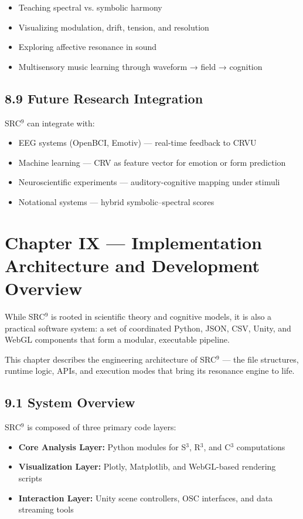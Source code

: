 \begin{itemize}
    \item Teaching spectral vs. symbolic harmony
    \item Visualizing modulation, drift, tension, and resolution
    \item Exploring affective resonance in sound
    \item Multisensory music learning through waveform → field → cognition
\end{itemize}

\subsection*{8.9 Future Research Integration}

SRC$^{9}$ can integrate with:

\begin{itemize}
    \item EEG systems (OpenBCI, Emotiv) — real-time feedback to CRVU
    \item Machine learning — CRV as feature vector for emotion or form prediction
    \item Neuroscientific experiments — auditory-cognitive mapping under stimuli
    \item Notational systems — hybrid symbolic–spectral scores
\end{itemize}

\section*{Chapter IX — Implementation Architecture and Development Overview}

While SRC$^{9}$ is rooted in scientific theory and cognitive models, it is also a practical software system: a set of coordinated Python, JSON, CSV, Unity, and WebGL components that form a modular, executable pipeline.

This chapter describes the engineering architecture of SRC$^{9}$ — the file structures, runtime logic, APIs, and execution modes that bring its resonance engine to life.

\subsection*{9.1 System Overview}

SRC$^{9}$ is composed of three primary code layers:

\begin{itemize}
    \item \textbf{Core Analysis Layer:} Python modules for S$^3$, R$^3$, and C$^3$ computations
    \item \textbf{Visualization Layer:} Plotly, Matplotlib, and WebGL-based rendering scripts
    \item \textbf{Interaction Layer:} Unity scene controllers, OSC interfaces, and data streaming tools
\end{itemize}

